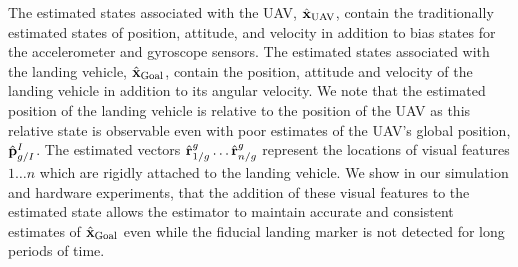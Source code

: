 The estimated states associated with the UAV, $\hat{\boldsymbol{\mathrm{x}}}_{\text{UAV}}$,
contain the traditionally estimated states of position, attitude, and velocity
in addition to bias states for the accelerometer and gyroscope sensors. The
estimated states associated with the landing vehicle,
$\hat{\boldsymbol{\mathrm{x}}}_{\text{Goal}}$, contain the position, attitude and velocity
of the landing vehicle in addition to its angular velocity. We note that the
estimated position of the landing vehicle is relative to the position of the UAV
as this relative state is observable even with poor estimates of the UAV's global
position, $\hat{\boldsymbol{\mathrm{p}}}_{g/I}^I$.
The estimated vectors $\hat{\boldsymbol{\mathrm{r}}}_{1/g}^{g} \dots \hat{\boldsymbol{\mathrm{r}}}_{n/g}^{g}$ represent the
locations of visual features $1 \dots n$ which are rigidly attached to the
landing vehicle. We show in our simulation and hardware experiments, that the
addition of these visual features to the estimated state allows the estimator
to maintain accurate and consistent estimates of $\hat{\boldsymbol{\mathrm{x}}}_{\text{Goal}}$ even
while the fiducial landing marker is not detected for long periods of time. 


